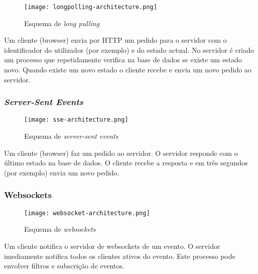 \begin{figure}[H]
\centering
\texttt{[image: longpolling-architecture.png]}
\caption{Esquema de \textit{long pulling}}
\label{fig:long_pulling}
\end{figure}

Um cliente (browser) envia por HTTP um pedido para o servidor com o identificador do utilizador (por exemplo) e do estado actual. No servidor é criado um processo que repetidamente verifica na base de dados se existe um estado novo. Quando existe um novo estado o cliente recebe e envia um novo pedido ao servidor.

\subsubsection{\textit{Server-Sent Events}}

\begin{figure}[H]
\centering
\texttt{[image: sse-architecture.png]}
\caption{Esquema de \textit{server-sent events}}
\label{fig:sse-architecture}
\end{figure}

Um cliente (browser) faz um pedido ao servidor. O servidor responde com o último estado na base de dados. O cliente recebe a resposta e em três segundos (por exemplo) envia um novo pedido.

\subsubsection{Websockets}

\begin{figure}[H]
\centering
\texttt{[image: websocket-architecture.png]}
\caption{Esquema de \textit{websockets}}
\label{fig:websockets-architecture}
\end{figure}

Um cliente notifica o servidor de websockets de um evento. O servidor imediamente notifica todos os clientes ativos do evento. Este processo pode envolver filtros e subscrição de eventos.
